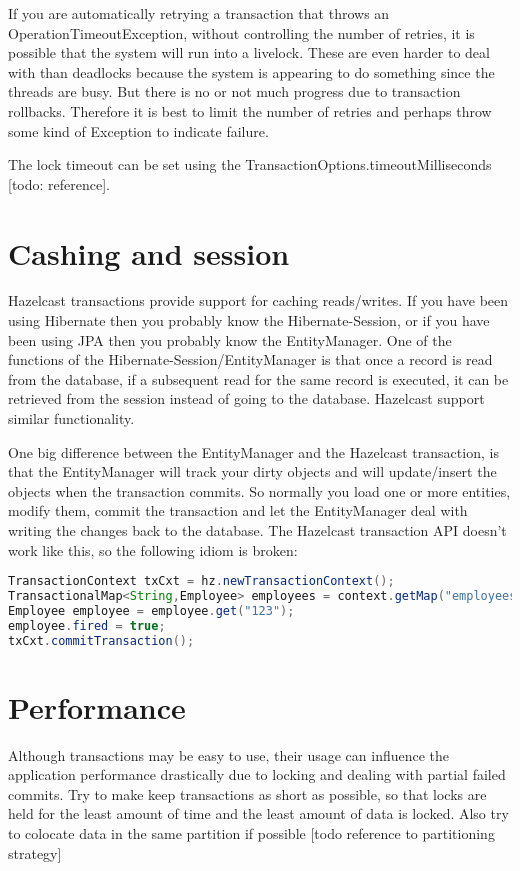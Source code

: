 If you are automatically retrying a transaction that throws an OperationTimeoutException, without controlling the number of retries, it is possible that the system will run into a livelock. These are even harder to deal with than deadlocks because the system is appearing to do something since the threads are busy. But there is no or not much progress due to transaction rollbacks. Therefore it is best to limit the number of retries and perhaps throw some kind of Exception to indicate failure.

The lock timeout can be set using the TransactionOptions.timeoutMilliseconds [todo: reference]. 

\section{Cashing and session}
Hazelcast transactions provide support for caching reads/writes. If you have been using Hibernate then you probably know the Hibernate-Session, or if you have been using JPA then you probably know the EntityManager. One of the functions of the Hibernate-Session/EntityManager is that once a record is read from the database, if a subsequent read for the same record is executed, it can be retrieved from the session instead of going to the database. Hazelcast support similar functionality.

One big difference between the EntityManager and the Hazelcast transaction, is that the EntityManager will track your dirty objects and will update/insert the objects when the transaction commits. So normally you load one or more entities, modify them, commit the transaction and let the EntityManager deal with writing the changes back to the database. The Hazelcast transaction API doesn't work like this, so the following idiom is broken:
\begin{lstlisting}[language=java]
TransactionContext txCxt = hz.newTransactionContext();
TransactionalMap<String,Employee> employees = context.getMap("employees");
Employee employee = employee.get("123");
employee.fired = true;
txCxt.commitTransaction();
\end{lstlisting}

\section{Performance}
Although transactions may be easy to use, their usage can influence the application performance drastically due to locking and dealing with partial failed commits. Try to make keep transactions as short as possible, so that locks are held for the least amount of time and the least amount of data is locked. Also try to colocate data in the same partition if possible [todo reference to partitioning strategy]


